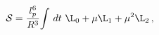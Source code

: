 \begin{equation}
{\cal
S}=\displaystyle{\frac{l_{p}^{6}}{R^{3}}}\displaystyle{\int\,dt}~
\L_{0}+\mu\L_{1}+\mu^{2}\L_{2}\,, \label{Maction}
\end{equation}


